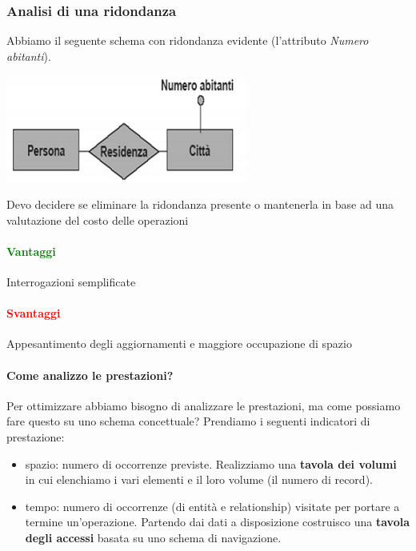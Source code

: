 \subsubsection{Analisi di una ridondanza}
Abbiamo il seguente schema con ridondanza evidente (l'attributo \emph{Numero abitanti}).
\begin{center}
	\includegraphics{images/112.PNG}
\end{center}
Devo decidere se eliminare la ridondanza presente o mantenerla in base ad una valutazione del costo delle operazioni
\paragraph{\textcolor{green}{Vantaggi}} Interrogazioni semplificate
\paragraph{\textcolor{red}{Svantaggi}} Appesantimento degli aggiornamenti e maggiore occupazione di spazio
\paragraph{Come analizzo le prestazioni?} Per ottimizzare abbiamo bisogno di analizzare le prestazioni, ma come possiamo fare questo su uno schema concettuale? Prendiamo i seguenti indicatori di prestazione:
\begin{itemize}
	\item spazio: numero di occorrenze previste. Realizziamo una \textbf{tavola dei volumi} in cui elenchiamo i vari elementi e il loro volume (il numero di record).
	\item tempo: numero di occorrenze (di entità e relationship) visitate per portare a termine un'operazione. Partendo dai dati a disposizione costruisco una \textbf{tavola degli accessi} basata su uno schema di navigazione.
\end{itemize}
